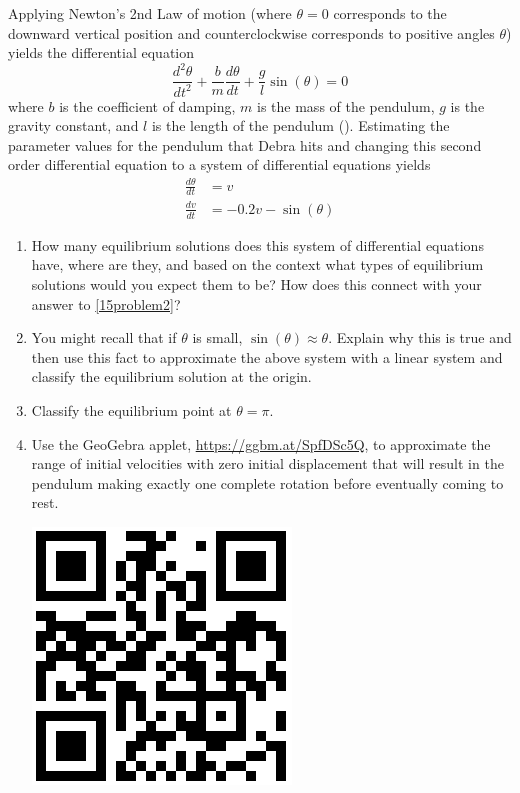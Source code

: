 Applying Newton's 2nd Law of motion (where $\theta = 0$ corresponds to the downward vertical position and counterclockwise corresponds to positive angles $\theta$) yields the differential equation
\[
\frac{d^2\theta}{dt^2}+\frac{b}{m}\frac{d\theta}{dt}+\frac{g}{l}\sin(\theta)=0
\]
where $b$ is the coefficient of damping, $m$ is the mass of the pendulum, $g$ is the gravity constant, and $l$ is the length of the pendulum ({}). Estimating the parameter values for the pendulum that Debra hits and changing this second order differential equation to a system of differential equations yields
\begin{align*}
\frac{d\theta}{dt} &=v \\
\frac{dv}{dt} &=-0.2v-\sin(\theta)
\end{align*}

\begin{enumerate}[resume]

\item How many equilibrium solutions does this system of differential equations have, where are they, and based on the context what types of equilibrium solutions would you expect them to be?  How does this connect with your answer to \ref{15problem2}? \label{15problem3} \vfill

\item You might recall that if $\theta$ is small, $\sin(\theta) \approx \theta$. Explain why this is true and then use this fact to approximate the above system with a linear system and classify the equilibrium solution at the origin. \label{15problem4} \vfill

\item Classify the equilibrium point at $\theta=\pi$. \label{15problem5} \vfill

\item Use the GeoGebra applet, \href{https://ggbm.at/SpfDSc5Q}{\underline{https://ggbm.at/SpfDSc5Q}}, to approximate the range of initial velocities with zero initial displacement that will result in the pendulum making exactly one complete rotation before eventually coming to rest. \label{15problem6}

\vspace{-.4in}\hspace{-.6in}\includegraphics[width=.5in]{15/15PendulumQR.png}
\vfill
\end{enumerate}
\clearpage

